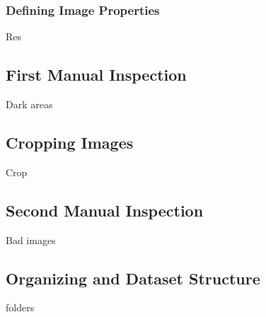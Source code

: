\subsubsection{Defining Image Properties}

Res

\subsection{First Manual Inspection}

Dark areas

\subsection{Cropping Images}

Crop

\subsection{Second Manual Inspection}

Bad images

\subsection{Organizing and Dataset Structure}

folders